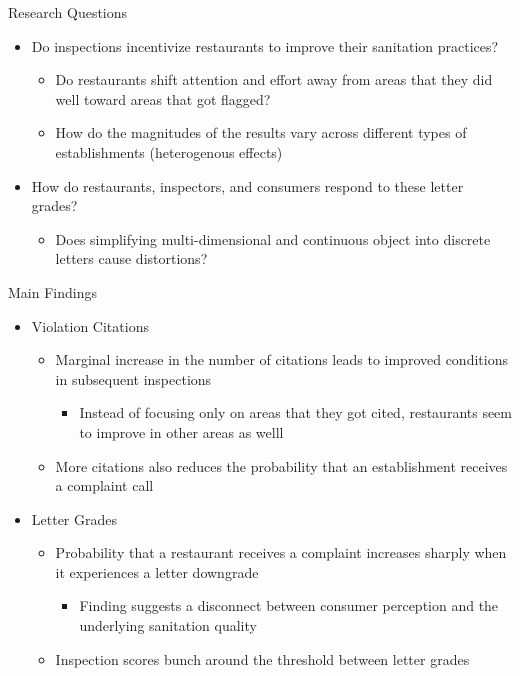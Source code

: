 \documentclass[handout]{beamer}
\begin{document}
\begin{frame}{Research Questions}
\pause
\begin{itemize}
\item Do inspections incentivize restaurants to improve their sanitation practices?
\begin{itemize}
\item Do restaurants shift attention and effort away from areas that they did well toward areas that got flagged?
\item How do the magnitudes of the results vary across different types of establishments (heterogenous effects)
\end{itemize}
\pause
\item How do restaurants, inspectors, and consumers respond to these letter grades?
\begin{itemize}
\item Does simplifying multi-dimensional and continuous object into discrete letters cause distortions?
\end{itemize}
\end{itemize}
\end{frame}

\begin{frame}{Main Findings}
\begin{itemize}
\item Violation Citations
\begin{itemize}
\item Marginal increase in the number of citations leads to improved conditions in subsequent inspections
\begin{itemize}
\item Instead of focusing only on areas that they got cited, restaurants seem to improve in other areas as welll
\end{itemize}
\item More citations also reduces the probability that an establishment receives a complaint call
\end{itemize}
\item Letter Grades
\begin{itemize}
\item Probability that a restaurant receives a complaint increases sharply when it experiences a letter downgrade
\begin{itemize}
\item Finding suggests a disconnect between consumer perception and the underlying sanitation quality
\end{itemize}
\item Inspection scores bunch around the threshold between letter grades
\end{itemize}
\end{itemize}
\end{frame}
\end{document}
